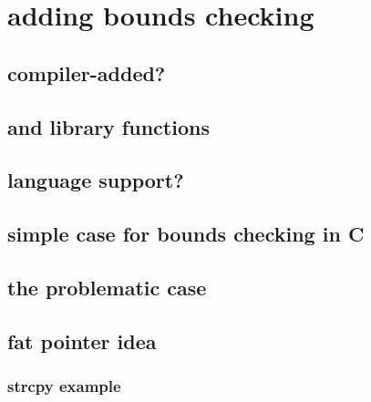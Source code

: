 \date{}

\begin{frame}
    \titlepage
\end{frame}


\usetikzlibrary{arrows.meta,calc,patterns}

\section{adding bounds checking}


\subsection{compiler-added?}

\subsection{and library functions}


\subsection{language support?}



\subsection{simple case for bounds checking in C}


\subsection{the problematic case}


\subsection{fat pointer idea}


\subsubsection{strcpy example}


